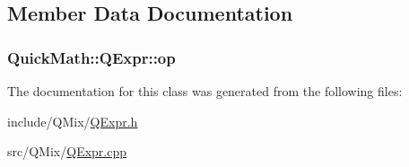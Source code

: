 \subsection{Member Data Documentation}
\hypertarget{classQuickMath_1_1QExpr_adb14b90658bcec8024881371b9b87c10}{}
\subsubsection[{op}]{ Quick\+Math\+::\+Q\+Expr\+::op\hspace{0.3cm}{\ttfamily [protected]}}\label{classQuickMath_1_1QExpr_adb14b90658bcec8024881371b9b87c10}


The documentation for this class was generated from the following files\+:\begin{DoxyCompactItemize}
\item 
include/\+Q\+Mix/\hyperlink{QExpr_8h}{Q\+Expr.\+h}\item 
src/\+Q\+Mix/\hyperlink{QExpr_8cpp}{Q\+Expr.\+cpp}\end{DoxyCompactItemize}
